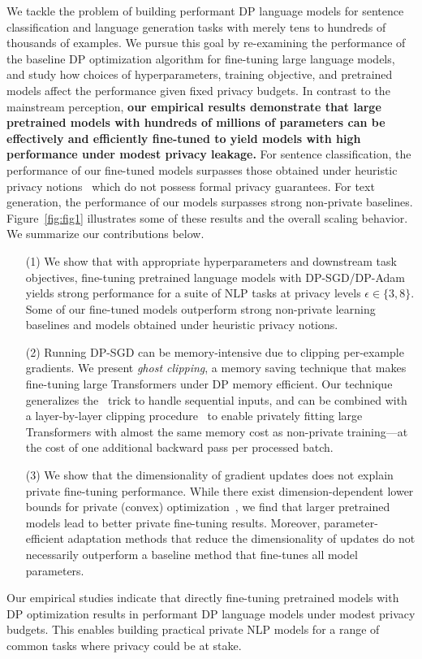 We tackle the problem of building performant DP language models for sentence classification and language generation tasks with merely tens to hundreds of thousands of examples.
We pursue this goal by re-examining the performance of the baseline DP optimization algorithm for fine-tuning large language models, and study how choices of hyperparameters, training objective, and pretrained models affect the performance given fixed privacy budgets. 
In contrast to the mainstream perception, \textbf{our empirical results demonstrate that large pretrained models with hundreds of millions of parameters can be effectively and efficiently fine-tuned to yield models with high performance under modest privacy leakage.}
For sentence classification, the performance of our fine-tuned models surpasses those obtained under heuristic privacy notions~\citep{huang2020texthide} which do not possess formal privacy guarantees.
For text generation, the performance of our models surpasses strong non-private baselines. 
Figure~\ref{fig:fig1} illustrates some of these results and the overall scaling behavior.
We summarize our contributions below.
\begin{itemize}[leftmargin=6mm]
    \setlength\itemsep{0.2mm}
    \item [(1)] We show that with appropriate hyperparameters and downstream task objectives, fine-tuning pretrained language models with DP-SGD/DP-Adam yields strong performance for a suite of NLP tasks at privacy levels $\epsilon \in \{3, 8 \}$. 
      Some of our fine-tuned models outperform strong non-private learning baselines and models obtained under heuristic privacy notions. 
    \item [(2)] Running DP-SGD can be memory-intensive due to clipping per-example gradients.
      We present \textit{ghost clipping}, a memory saving technique that makes fine-tuning large Transformers under DP memory efficient.
      Our technique generalizes the~\cite{goodfellow2015efficient} trick to handle sequential inputs, and
      can be combined with a layer-by-layer clipping procedure~\citep{lee2020scaling} to enable privately fitting large Transformers with almost the same memory cost as non-private training---at the cost of one additional backward pass per processed batch.
    \item [(3)] We show that the dimensionality of gradient updates does not explain private fine-tuning performance.
      While there exist dimension-dependent lower bounds for private (convex) optimization~\citep{bassily2014differentially}, we find that larger pretrained models lead to better private fine-tuning results. Moreover, parameter-efficient adaptation methods that reduce the dimensionality of updates do not  necessarily outperform a baseline method that fine-tunes all model parameters.
\end{itemize}
Our empirical studies indicate that directly fine-tuning pretrained models with DP optimization results in performant DP language models under modest privacy budgets.
This enables building practical private NLP models for a range of common tasks where privacy could be at stake.

